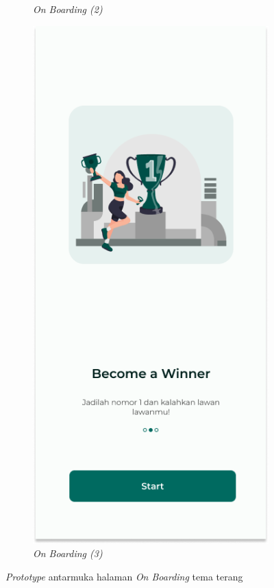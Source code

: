 \begin{figure}[H]
\begin{subfigure}[b]{0.23\textwidth}
	  \caption{\textit{On Boarding (2)}}
	  \label{fig:HasilBoarding2}
	\end{subfigure}
	\begin{subfigure}[b]{0.23\textwidth}
		\centering
	  \includegraphics[width=\linewidth]{contents/chapter-3/images/HF-Boarding-3.png}
	  \caption{\textit{On Boarding (3)}}
	  \label{fig:HasilBoarding3}
	\end{subfigure}
	\caption{\textit{Prototype} antarmuka halaman \textit{On Boarding} tema terang}
	\label{Fig:HasilFeatureSetBoarding}
\end{figure}
